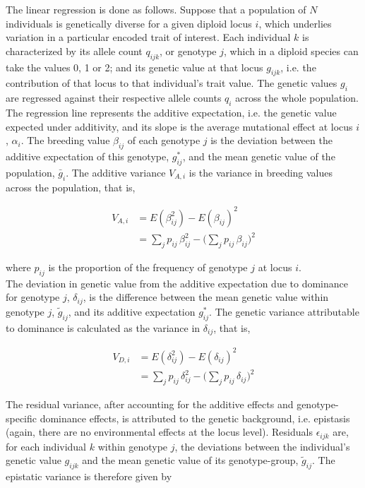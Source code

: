 \documentclass[]{article}
\begin{document}
The linear regression is done as follows. Suppose that a population of $N$ individuals is genetically diverse for a given diploid locus $i$, which underlies variation in a particular encoded trait of interest. Each individual $k$ is characterized by its allele count $q_{ijk}$, or genotype $j$, which in a diploid species can take the values 0, 1 or 2; and its genetic value at that locus $g_{ijk}$, i.e. the contribution of that locus to that individual's trait value. The genetic values $g_i$ are regressed against their respective allele counts $q_i$ across the whole population. The regression line represents the additive expectation, i.e. the genetic value expected under additivity, and its slope is the average mutational effect at locus $i$, $\alpha_i$. The breeding value $\beta_{ij}$ of each genotype $j$ is the deviation between the additive expectation of this genotype, $g^*_{ij}$, and the mean genetic value of the population, $\bar{g}_i$. The additive variance $V_{A,i}$ is the variance in breeding values across the population, that is,

\begin{align} 
V_{A,i} &= E(\beta_{ij}^2) - E(\beta_{ij})^2\\
&= \sum_j p_{ij} \, \beta_{ij}^2 - \bigg( \sum_j p_{ij} \, \beta_{ij} \bigg)^2
\end{align}

where $p_{ij}$ is the proportion of the frequency of genotype $j$ at locus $i$.\\

The deviation in genetic value from the additive expectation due to dominance for genotype $j$, $\delta_{ij}$, is the difference between the mean genetic value within genotype $j$, $\tilde{g}_{ij}$, and its additive expectation $g^*_{ij}$. The genetic variance attributable to dominance is calculated as the variance in $\delta_{ij}$, that is,

\begin{align}
V_{D,i} &= E(\delta_{ij}^2) - E(\delta_{ij})^2\\
&= \sum_j p_{ij} \, \delta_{ij}^2 - \bigg( \sum_j p_{ij} \, \delta_{ij} \bigg)^2
\end{align}

The residual variance, after accounting for the additive effects and genotype-specific dominance effects, is attributed to the genetic background, i.e. epistasis (again, there are no environmental effects at the locus level). Residuals $\epsilon_{ijk}$ are, for each individual $k$ within genotype $j$, the deviations between the individual's genetic value $g_{ijk}$ and the mean genetic value of its genotype-group, $\tilde{g}_{ij}$. The epistatic variance is therefore given by
\end{document}
